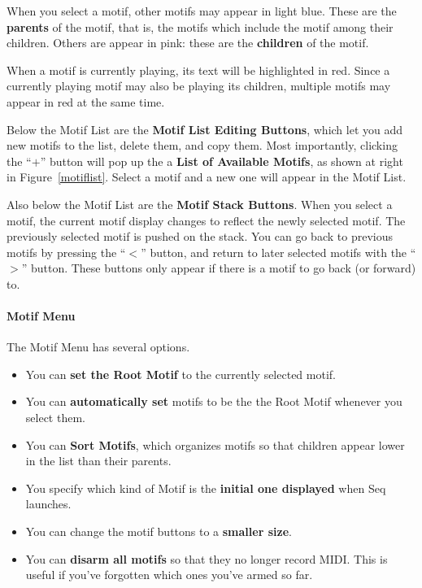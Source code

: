 \documentclass[twoside,10pt]{article}
\begin{document}
When you select a motif, other motifs may appear in light blue.  These are the {\bf parents} of the motif, that is, the motifs which include the motif among their children.  Others are appear in pink: these are the {\bf children} of the motif.

When a motif is currently playing, its text will be highlighted in red.  Since a currently playing motif may also be playing its children, multiple motifs may appear in red at the same time.

Below the Motif List are the {\bf Motif List Editing Buttons}, which let you add new motifs to the list, delete them, and copy them.   Most importantly, clicking the ``\(+\)'' button will pop up the a {\bf List of Available Motifs}, as shown at right in Figure~\ref{motiflist}.  Select a motif and a new one will appear in the Motif List. 

Also below the Motif List are the {\bf Motif Stack Buttons}.  When you select a motif, the current motif display changes to reflect the newly selected motif.  The previously selected motif is pushed on the stack.  You can go back to previous motifs by pressing the ``\(<\)'' button, and return to later selected motifs with the ``\(>\)'' button.  These buttons only appear if there is a motif to go back (or forward) to.

\paragraph{Motif Menu}

The Motif Menu has several options.  

	\begin{itemize}
	\item You can {\bf set the Root Motif} to the currently selected motif.  
	\item You can {\bf automatically set} motifs to be the the Root Motif whenever you select them.  
	\item You can {\bf Sort Motifs}, which organizes motifs so that children appear lower in the list than their parents.  
	\item You specify which kind of Motif is the {\bf initial one displayed} when Seq launches.
	\item You can change the motif buttons to a {\bf smaller size}.
	\item You can {\bf disarm all motifs} so that they no longer record MIDI.  This is useful if you've forgotten which ones you've armed so far.
	\end{itemize}
\end{document}
